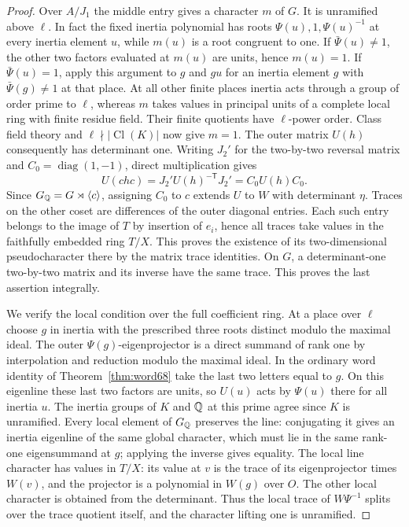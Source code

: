 \documentclass[a4paper,11pt]{article}
\theoremstyle{definition}
\theoremstyle{remark}
\numberwithin{equation}{section}
\begin{document}
\begin{proof}
Over \(A/J_1\) the middle entry gives a character \(m\) of \(G\).
It is unramified above \(\ell\). In fact the fixed inertia
polynomial has roots \(\Psi(u),1,\Psi(u)^{-1}\) at every
inertia element \(u\), while \(m(u)\) is a root congruent
to one. If \(\bar\Psi(u)\ne1\), the other two factors evaluated
at \(m(u)\) are units, hence \(m(u)=1\). If \(\bar\Psi(u)=1\),
apply this argument to \(g\) and \(gu\) for an inertia element
\(g\) with \(\bar\Psi(g)\ne1\) at that place. At all other
finite places inertia acts through a group of order prime to
\(\ell\), whereas \(m\) takes values in principal units of a
complete local ring with finite residue field. Their finite
quotients have \(\ell\)-power order. Class field theory and
\(\ell\nmid |\operatorname{Cl}(K)|\) now give \(m=1\).
The outer matrix \(U(h)\) consequently has determinant one.
Writing \(J_2'\) for the two-by-two reversal matrix and
\(C_0=\operatorname{diag}(1,-1)\), direct multiplication gives
\[
 U(chc)=J_2'U(h)^{-\mathsf T}J_2'=C_0U(h)C_0 .
\]
Since \(G_\mathbb Q=G\rtimes\langle c\rangle\), assigning \(C_0\)
to \(c\) extends \(U\) to \(W\) with determinant \(\eta\).
Traces on the other coset are differences of the outer
diagonal entries. Each such entry belongs to the image of
\(T\) by insertion of \(e_i\), hence all traces take values
in the faithfully embedded ring \(T/X\). This proves the
existence of its two-dimensional pseudocharacter there by
the matrix trace identities. On \(G\), a determinant-one
two-by-two matrix and its inverse have the same trace.
This proves the last assertion integrally.

We verify the local condition over the full coefficient ring.
At a place over \(\ell\) choose \(g\) in inertia with the
prescribed three roots distinct modulo the maximal ideal.
The outer \(\Psi(g)\)-eigenprojector is a direct summand of
rank one by interpolation and reduction modulo the maximal
ideal. In the ordinary word identity of
Theorem~\ref{thm:word68} take the last two letters equal
to \(g\). On this eigenline these last two factors are units,
so \(U(u)\) acts by \(\Psi(u)\) there for all inertia \(u\).
The inertia groups of \(K\) and \(\mathbb Q\) at this prime agree
since \(K\) is unramified. Every local element of \(G_\mathbb Q\)
preserves the line: conjugating it gives an inertia eigenline
of the same global character, which must lie in the same
rank-one eigensummand at \(g\); applying the inverse gives
equality. The local line character has values in \(T/X\):
its value at \(v\) is the trace of its eigenprojector times
\(W(v)\), and the projector is a polynomial in \(W(g)\)
over \(O\). The other local character is obtained from
the determinant. Thus the local trace of \(W\Psi^{-1}\)
splits over the trace quotient itself, and the character
lifting one is unramified.


\end{proof}
\end{document}
